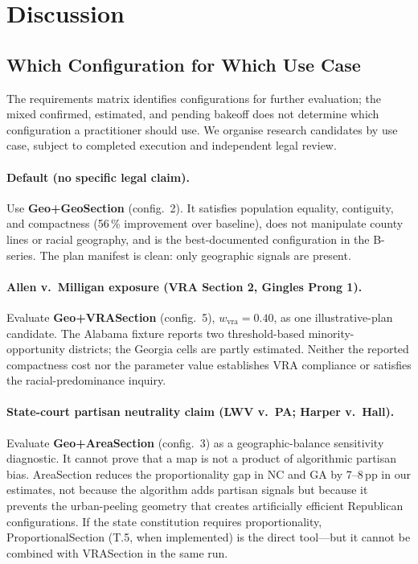 \section{Discussion}
\label{sec:discussion}

\subsection{Which Configuration for Which Use Case}

The requirements matrix identifies configurations for further evaluation; the
mixed confirmed, estimated, and pending bakeoff does not determine which
configuration a practitioner should use. We organise research candidates by
use case, subject to completed execution and independent legal review.

\paragraph{Default (no specific legal claim).}
Use \textbf{Geo+GeoSection} (config.~2).
It satisfies population equality, contiguity, and compactness (56\,\% improvement
over baseline), does not manipulate county lines or racial geography, and is
the best-documented configuration in the B-series.
The plan manifest is clean: only geographic signals are present.

\paragraph{Allen v.\ Milligan exposure (VRA Section 2, Gingles Prong 1).}
Evaluate \textbf{Geo+VRASection} (config.~5), $w_\text{vra} = 0.40$, as one
illustrative-plan candidate. The Alabama fixture reports two threshold-based
minority-opportunity districts; the Georgia cells are partly estimated. Neither
the reported compactness cost nor the parameter value establishes VRA
compliance or satisfies the \miller{} racial-predominance inquiry.

\paragraph{State-court partisan neutrality claim (LWV v.\ PA; Harper v.\ Hall).}
Evaluate \textbf{Geo+AreaSection} (config.~3) as a geographic-balance
sensitivity diagnostic. It cannot prove that a map is not a product of
algorithmic partisan bias.
AreaSection reduces the proportionality gap in NC and GA by 7--8\,pp in our
estimates, not because the algorithm adds partisan signals but because it
prevents the urban-peeling geometry that creates artificially efficient Republican
configurations.
If the state constitution requires proportionality, ProportionalSection (T.5,
when implemented) is the direct tool---but it cannot be combined with VRASection
in the same run.

